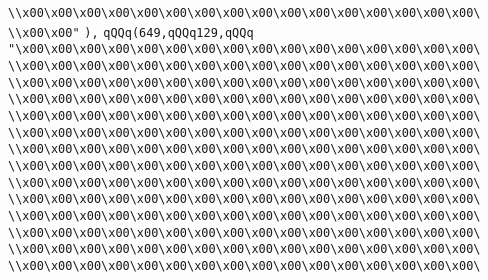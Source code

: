 \verb|\\x00\x00\x00\x00\x00\x00\x00\x00\x00\x00\x00\x00\x00\x00\x00\x00\|\newline
\verb|\\x00\x00"|\newline
\verb|),|\newline
\verb|qQQq(649,qQQq129,qQQq|\newline
\verb|"\x00\x00\x00\x00\x00\x00\x00\x00\x00\x00\x00\x00\x00\x00\x00\x00\|\newline
\verb|\\x00\x00\x00\x00\x00\x00\x00\x00\x00\x00\x00\x00\x00\x00\x00\x00\|\newline
\verb|\\x00\x00\x00\x00\x00\x00\x00\x00\x00\x00\x00\x00\x00\x00\x00\x00\|\newline
\verb|\\x00\x00\x00\x00\x00\x00\x00\x00\x00\x00\x00\x00\x00\x00\x00\x00\|\newline
\verb|\\x00\x00\x00\x00\x00\x00\x00\x00\x00\x00\x00\x00\x00\x00\x00\x00\|\newline
\verb|\\x00\x00\x00\x00\x00\x00\x00\x00\x00\x00\x00\x00\x00\x00\x00\x00\|\newline
\verb|\\x00\x00\x00\x00\x00\x00\x00\x00\x00\x00\x00\x00\x00\x00\x00\x00\|\newline
\verb|\\x00\x00\x00\x00\x00\x00\x00\x00\x00\x00\x00\x00\x00\x00\x00\x00\|\newline
\verb|\\x00\x00\x00\x00\x00\x00\x00\x00\x00\x00\x00\x00\x00\x00\x00\x00\|\newline
\verb|\\x00\x00\x00\x00\x00\x00\x00\x00\x00\x00\x00\x00\x00\x00\x00\x00\|\newline
\verb|\\x00\x00\x00\x00\x00\x00\x00\x00\x00\x00\x00\x00\x00\x00\x00\x00\|\newline
\verb|\\x00\x00\x00\x00\x00\x00\x00\x00\x00\x00\x00\x00\x00\x00\x00\x00\|\newline
\verb|\\x00\x00\x00\x00\x00\x00\x00\x00\x00\x00\x00\x00\x00\x00\x00\x00\|\newline
\verb|\\x00\x00\x00\x00\x00\x00\x00\x00\x00\x00\x00\x00\x00\x00\x00\x00\|\newline
